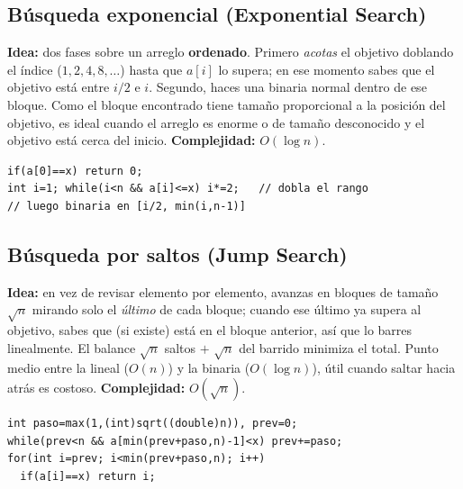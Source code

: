 \documentclass[10pt,a4paper,twocolumn]{article}
\begin{document}
\subsection{Búsqueda exponencial (Exponential Search)}
\textbf{Idea:} dos fases sobre un arreglo \textbf{ordenado}. Primero
\emph{acotas} el objetivo doblando el índice ($1,2,4,8,\dots$) hasta que
$a[i]$ lo supera; en ese momento sabes que el objetivo está entre $i/2$
e $i$. Segundo, haces una binaria normal dentro de ese bloque. Como el
bloque encontrado tiene tamaño proporcional a la posición del objetivo,
es ideal cuando el arreglo es enorme o de tamaño desconocido y el
objetivo está cerca del inicio. \textbf{Complejidad:} $O(\log n)$.
\begin{lstlisting}[style=cpp]
if(a[0]==x) return 0;
int i=1; while(i<n && a[i]<=x) i*=2;   // dobla el rango
// luego binaria en [i/2, min(i,n-1)]
\end{lstlisting}

\subsection{Búsqueda por saltos (Jump Search)}
\textbf{Idea:} en vez de revisar elemento por elemento, avanzas en
bloques de tamaño $\sqrt{n}$ mirando solo el \emph{último} de cada
bloque; cuando ese último ya supera al objetivo, sabes que (si existe)
está en el bloque anterior, así que lo barres linealmente. El balance
$\sqrt{n}$ saltos $+$ $\sqrt{n}$ del barrido minimiza el total. Punto
medio entre la lineal ($O(n)$) y la binaria ($O(\log n)$), útil cuando
saltar hacia atrás es costoso. \textbf{Complejidad:} $O(\sqrt{n})$.
\begin{lstlisting}[style=cpp]
int paso=max(1,(int)sqrt((double)n)), prev=0;
while(prev<n && a[min(prev+paso,n)-1]<x) prev+=paso;
for(int i=prev; i<min(prev+paso,n); i++)
  if(a[i]==x) return i;
\end{lstlisting}
\end{document}
